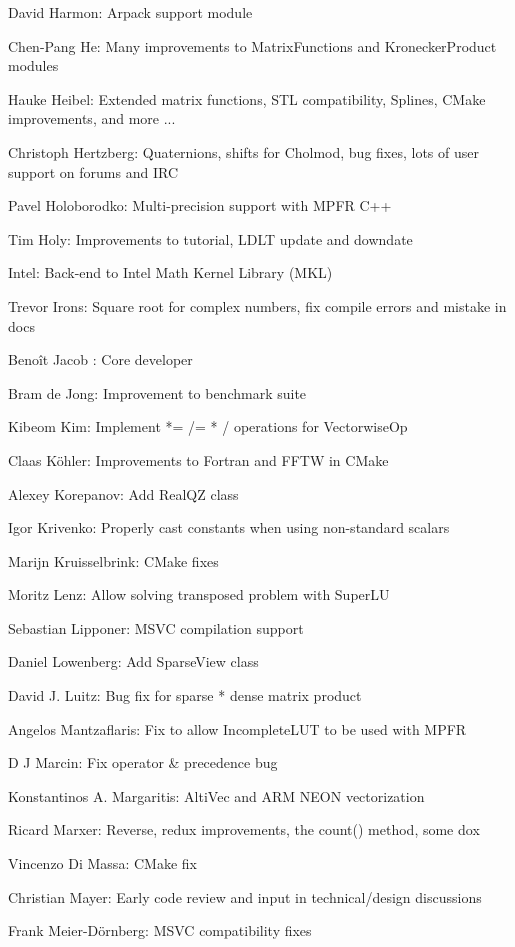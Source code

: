 David Harmon:  Arpack support module  

Chen-Pang He:  Many improvements to MatrixFunctions and KroneckerProduct modules  

Hauke Heibel:  Extended matrix functions, STL compatibility, Splines, CMake improvements, and more ...  

Christoph Hertzberg:  Quaternions, shifts for Cholmod, bug fixes, lots of user support on forums and IRC  

Pavel Holoborodko:  Multi-precision support with MPFR C++  

Tim Holy:  Improvements to tutorial, LDLT update and downdate  

Intel:  Back-end to Intel Math Kernel Library (MKL)  

Trevor Irons:  Square root for complex numbers, fix compile errors and mistake in docs  

Benoît Jacob : Core developer  

Bram de Jong:  Improvement to benchmark suite  

Kibeom Kim:  Implement *= /= * / operations for VectorwiseOp  

Claas Köhler:  Improvements to Fortran and FFTW in CMake  

Alexey Korepanov:  Add RealQZ class  

Igor Krivenko:  Properly cast constants when using non-standard scalars  

Marijn Kruisselbrink:  CMake fixes  

Moritz Lenz:  Allow solving transposed problem with SuperLU  

Sebastian Lipponer:  MSVC compilation support  

Daniel Lowenberg:  Add SparseView class  

David J. Luitz:  Bug fix for sparse * dense matrix product  

Angelos Mantzaflaris:  Fix to allow IncompleteLUT to be used with MPFR  

D J Marcin:  Fix operator \& precedence bug  

Konstantinos A. Margaritis:  AltiVec and ARM NEON vectorization  

Ricard Marxer:  Reverse, redux improvements, the count() method, some dox  

Vincenzo Di Massa:  CMake fix  

Christian Mayer:  Early code review and input in technical/design discussions  

Frank Meier-Dörnberg:  MSVC compatibility fixes  

